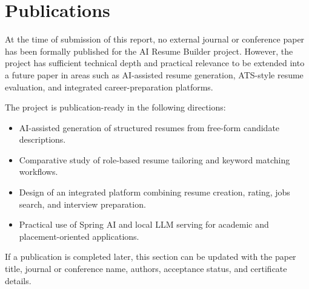 \section*{Publications}
\noindent At the time of submission of this report, no external journal or conference paper has been formally published for the AI Resume Builder project. However, the project has sufficient technical depth and practical relevance to be extended into a future paper in areas such as AI-assisted resume generation, ATS-style resume evaluation, and integrated career-preparation platforms.

\noindent The project is publication-ready in the following directions:
\begin{itemize}
\item AI-assisted generation of structured resumes from free-form candidate descriptions.
\item Comparative study of role-based resume tailoring and keyword matching workflows.
\item Design of an integrated platform combining resume creation, rating, jobs search, and interview preparation.
\item Practical use of Spring AI and local LLM serving for academic and placement-oriented applications.
\end{itemize}

\noindent If a publication is completed later, this section can be updated with the paper title, journal or conference name, authors, acceptance status, and certificate details.
